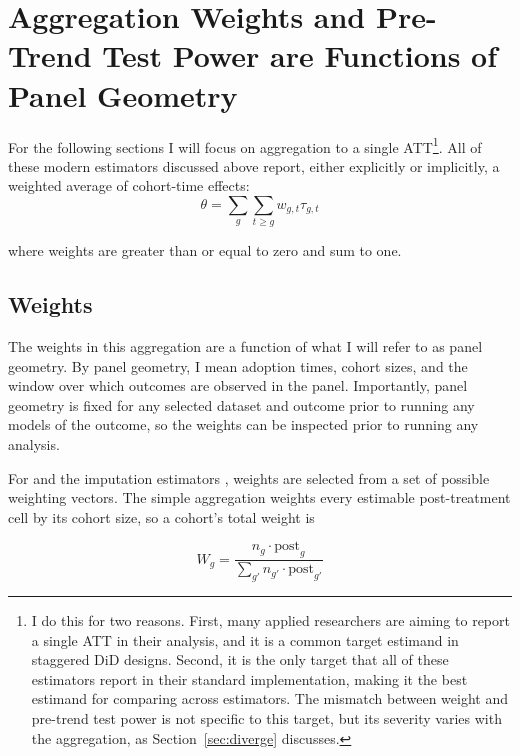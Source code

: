 \documentclass[12pt]{article}
\begin{document}
\section{Aggregation Weights and Pre-Trend Test Power are Functions of Panel Geometry}\label{sec:geometry}

For the following sections I will focus on aggregation to a single ATT\footnote{I do this for two reasons. First, many applied researchers are aiming to report a single ATT in their analysis, and it is a common target estimand in staggered DiD designs. Second, it is the only target that all of these estimators report in their standard implementation, making it the best estimand for comparing across estimators. The mismatch between weight and
pre-trend test power is not specific to this target, but its severity varies with the aggregation, as Section~\ref{sec:diverge} discusses.}. All of these modern estimators discussed above report, either explicitly or implicitly, a weighted average of cohort-time effects:
\begin{equation}\label{eq:theta}
    \theta = \sum_g \sum_{t\geq g} w_{g,t} \tau_{g,t}
\end{equation}

where weights are greater than or equal to zero and sum to one.

\subsection{Weights}            %

The weights in this aggregation are a function of what I will refer to as panel geometry. By panel geometry, I mean adoption times, cohort sizes, and the window over which outcomes are observed in the panel. Importantly, panel geometry is fixed for any selected dataset and outcome prior to running any models of the outcome, so the weights can be inspected prior to running any analysis.

For \textcite{callaway2021difference} and the imputation estimators \parencite{borusyak2024revisiting}, weights are selected from a set of possible weighting vectors. The simple aggregation weights every estimable post-treatment cell by its cohort size, so a cohort's total weight is 

\begin{equation}\label{eq:cs_simple}
    W_g = \frac{n_g \cdot \text{post}_g}{\sum_{g'} n_{g'} \cdot \text{post}_{g'}}
\end{equation}
\end{document}
